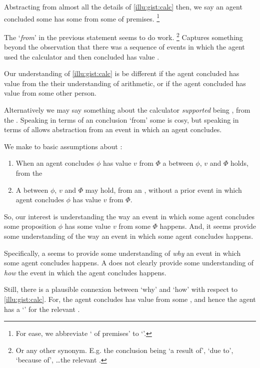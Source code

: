 \begin{note}
  Abstracting from almost all the details of \autoref{illu:gist:calc} then, we say an agent concluded some \prop{} has some \val{} from some \pool{} of premises.%
  \footnote{
    For ease, we abbreviate `\pool{} of premises' to `\pool{}'.
  }

  The `\emph{from}' in the previous statement seems to do work.%
  \footnote{
    Or any other synonym.
    E.g. the conclusion being `a result of', `due to', `because of', \dots the relevant \pool{}.
  }
  Captures something beyond the observation that there was a sequence of events in which the agent used the calculator and then concluded \propM{\gistCalcEq{}} has value .

  Our understanding of \autoref{illu:gist:calc} is be different if the agent concluded \propM{\gistCalcEq{}} has value  from the their understanding of arithmetic, or if the agent concluded \propM{\gistCalcEq{}} has value  from some other person.

  Alternatively we may say something about the calculator \emph{supported} \propM{\gistCalcEq{}} being , from the \agpe{}.
  Speaking in terms of an \agents{} conclusion `from' some \pool{} is cosy, but speaking in terms of \ros{}  allows abstraction from an event in which an agent concludes.

  We make to basic assumptions about \ros{}:
  \begin{enumerate}
  \item
    When an agent concludes \(\phi\) has value \(v\) from \(\Phi\) a \ros{} between \(\phi\), \(v\) and \(\Phi\) holds, from the \agpe{}
  \item
    A \ros{} between \(\phi\), \(v\) and \(\Phi\) may hold, from an \agpe{}, without a prior event in which agent concludes \(\phi\) has value \(v\) from \(\Phi\).
  \end{enumerate}
\end{note}

\begin{note}
  So, our interest is understanding the way an event in which some agent concludes some proposition \(\phi\) has some value \(v\) from some \pool{} \(\Phi\) happens.
  And, it seems  provide some understanding of the way an event in which some agent concludes happens.

  Specifically, a \ros{} seems to provide some understanding of \emph{why} an event in which some agent concludes happens.
  A \ros{} does not clearly provide some understanding of \emph{how} the event in which the agent concludes happens.

  Still, there is a plausible connexion between `why' and `how' with respect to \autoref{illu:gist:calc}.
  For, the agent concludes \propM{\gistCalcEq{}} has value  from some \pool{}, and hence the agent has a `\wit{}' for the relevant \ros{}.
\end{note}

